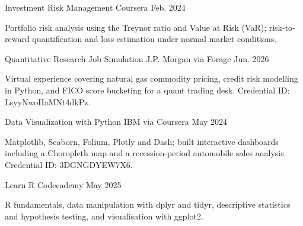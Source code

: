

\begin{cventries}

  \cventry
    {Investment Risk Management} %
    {Coursera} %
    {} %
    {Feb. 2024} %
    {
      \begin{cvitems}
        \item {Portfolio risk analysis using the Treynor ratio and Value at Risk (VaR); risk-to-reward quantification and loss estimation under normal market conditions.}
      \end{cvitems}
    }

  \cventry
    {Quantitative Research Job Simulation} %
    {J.P. Morgan via Forage} %
    {} %
    {Jun. 2026} %
    {
      \begin{cvitems}
        \item {Virtual experience covering natural gas commodity pricing, credit risk modelling in Python, and FICO score bucketing for a quant trading desk. Credential ID: LsyyNwoHaMNt4dkPz.}
      \end{cvitems}
    }

  \cventry
    {Data Visualization with Python} %
    {IBM via Coursera} %
    {} %
    {May 2024} %
    {
      \begin{cvitems}
        \item {Matplotlib, Seaborn, Folium, Plotly and Dash; built interactive dashboards including a Choropleth map and a recession-period automobile sales analysis. Credential ID: 3DGNGDYEW7X6.}
      \end{cvitems}
    }

  \cventry
    {Learn R} %
    {Codecademy} %
    {} %
    {May 2025} %
    {
      \begin{cvitems}
        \item {R fundamentals, data manipulation with dplyr and tidyr, descriptive statistics and hypothesis testing, and visualisation with ggplot2.}
      \end{cvitems}
    }


\end{cventries}
